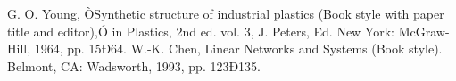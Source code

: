 \documentclass[letterpaper, 10 pt, conference]{ieeeconf}  %
\begin{document}


















\newpage
\begin{thebibliography}{99}

 G. O. Young, ÒSynthetic structure of industrial plastics (Book style with paper title and editor),Ó 	in Plastics, 2nd ed. vol. 3, J. Peters, Ed.  New York: McGraw-Hill, 1964, pp. 15Ð64.
 W.-K. Chen, Linear Networks and Systems (Book style).	Belmont, CA: Wadsworth, 1993, pp. 123Ð135.




\end{thebibliography}
\end{document}
